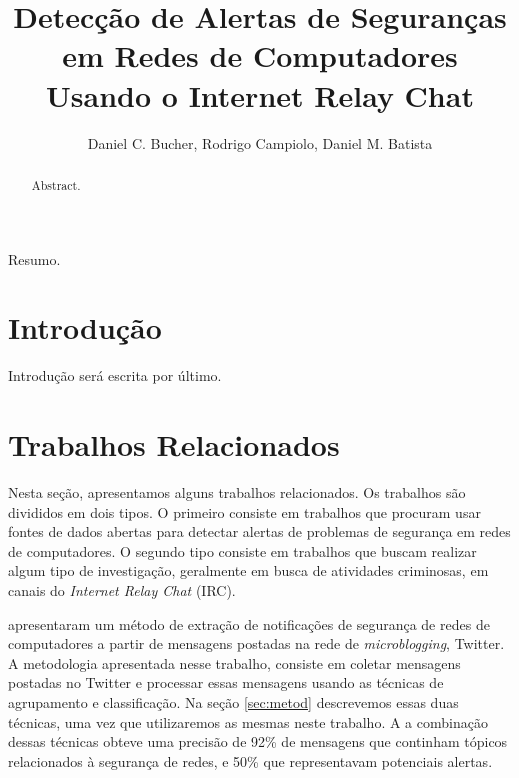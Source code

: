 \documentclass[12pt]{article}
\title{Detecção de Alertas de Seguranças em Redes de Computadores Usando o
Internet Relay Chat}
\author {Daniel C. Bucher\inst{1}, Rodrigo Campiolo\inst{1,2}, Daniel M. Batista\inst{1} }
\begin{document}
\maketitle

\begin{resumo}
  Resumo.


\end{resumo}

\begin{abstract}
  Abstract.


\end{abstract}

\section{Introdução} \label{sec:intro}

Introdução será escrita por último.

\section{Trabalhos Relacionados} \label{sec:rel}

Nesta seção, apresentamos alguns trabalhos relacionados. Os trabalhos são
divididos em dois tipos. O primeiro consiste em trabalhos que procuram usar fontes de
dados abertas para detectar alertas de problemas de segurança em redes de
computadores. O segundo tipo consiste em trabalhos que buscam realizar algum
tipo de investigação, geralmente em busca de atividades criminosas, em canais do
\textit{Internet Relay Chat} (IRC).

\cite{santos2013} apresentaram um método de extração de notificações de
segurança de redes de computadores a partir de mensagens postadas na rede de
\textit{microblogging}, Twitter.
%
A metodologia apresentada nesse trabalho, consiste em coletar mensagens
postadas no Twitter e processar essas mensagens usando as técnicas de
agrupamento e classificação. Na seção \ref{sec:metod} descrevemos essas duas
técnicas, uma vez que utilizaremos as mesmas neste trabalho.
%
A a combinação dessas técnicas obteve uma precisão de 92\% de mensagens
que continham tópicos relacionados à segurança de redes, e 50\% que
representavam potenciais alertas.
\end{document}
